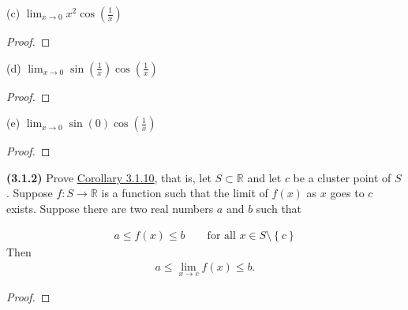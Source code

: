 \documentclass[12pt]{article}
\newcommand{\set}[1]{\left\{ {#1} \right\}}
\newcommand{\limit}[1]{\displaystyle \lim_{ {#1} }}
\newcommand{\paren}[1]{\left( {#1} \right)}
\newcommand{\bR}{\mathbb{R}}
\begin{document}
\noindent (c) $\limit{x\to0}x^2\cos\paren{\frac{1}{x}}$

\begin{proof}
	\lipsum[1][1-5]
\end{proof}

\noindent (d) $\limit{x\to0}\sin\paren{\frac{1}{x}}\cos\paren{\frac{1}{x}}$

\begin{proof}
	\lipsum[1][1-5]
\end{proof}

\noindent (e) $\limit{x\to0}\sin\paren{0}\cos\paren{\frac{1}{x}}$

\begin{proof}
	\lipsum[1][1-5]
\end{proof}
\newpage

\noindent \textbf{(3.1.2)} Prove \underline{Corollary 3.1.10}, that is, let $S\subset\bR$ and let $c$ be a cluster point of $S$. Suppose $f:S\to\bR$ is a function such that the limit of $f(x)$ as $x$ goes to $c$ exists. Suppose there are two real numbers $a$ and $b$ such that

\begin{align*}
	a\le f(x)\le b \qquad \text{for all }x\in S\setminus\set{c}
\end{align*}
\noindent Then
\begin{align*}
	a\le\limit{x\to c}f(x)\le b.
\end{align*}

\begin{proof}
	\lipsum[1]
\end{proof}
\end{document}
